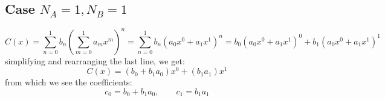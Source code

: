 \subsection{Case $N_A = 1, N_B = 1$}
\begin{equation}
  C(x) = \sum_{n=0}^{1} b_n \left( \sum_{m=0}^{1} a_m x^m \right)^n
       = \sum_{n=0}^{1} b_n \left( a_0 x^0 + a_1 x^1 \right)^n
       = b_0 (a_0 x^0 + a_1 x^1)^0 + b_1 (a_0 x^0 + a_1 x^1)^1
\end{equation}
simplifying and rearranging the last line, we get:
\begin{equation}
 C(x) = (b_0 + b_1 a_0) x^0 + (b_1 a_1) x^1
\end{equation}
from which we see the coefficients:
\begin{equation}
  c_0 = b_0 + b_1 a_0, \qquad c_1 = b_1 a_1
\end{equation}






